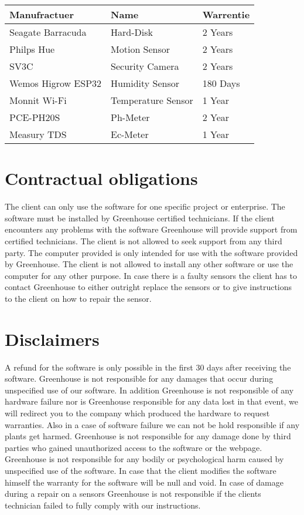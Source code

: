 \begin{table}
\begin{center}
\label{tab:Warrenties}
\begin{tabular}{| m{4cm} | m{4cm} | m{4cm} |}
\hline
\textbf{Manufractuer} & \textbf{Name} & \textbf{Warrentie} \\ \hline 
Seagate Barracuda & Hard-Disk & 2 Years \\ \hline 
Philps Hue & Motion Sensor & 2 Years \\ \hline 
SV3C & Security Camera & 2 Years \\ \hline 
Wemos Higrow ESP32 & Humidity Sensor & 180 Days \\ \hline
Monnit Wi-Fi & Temperature Sensor & 1 Year \\ \hline
PCE-PH20S& Ph-Meter & 2 Year \\ \hline
Measury TDS & Ec-Meter & 1 Year \\ 
\hline 
\end{tabular}
\end{center}
\end{table}


\section{Contractual obligations}
The client can only use the software for one specific project or enterprise. The
software must be installed by Greenhouse certified technicians. If the client
encounters any problems with the software Greenhouse will provide support from
certified technicians. The client is not allowed to seek support from any third
party. The computer provided is only intended for use with the software provided
by Greenhouse. The client is not allowed to install any other software or use
the computer for any other purpose. In case there is a faulty sensors the client
has to contact Greenhouse to either outright replace the sensors or to give
instructions to the client on how to repair the sensor.

\section{Disclaimers}
A refund for the software is only possible in the first 30 days after receiving
the software. Greenhouse is not responsible for any damages that occur during
unspecified use of our software. In addition Greenhouse is not responsible of
any hardware failure nor is Greenhouse responsible for any data lost in that
event, we will redirect you to the company which produced the hardware to
request warranties. Also in a case of software failure we can not be hold
responsible if any plants get harmed. Greenhouse is not responsible for any
damage done by third parties who gained unauthorized access to the software or
the webpage. Greenhouse is not responsible for any bodily or psychological harm
caused by unspecified use of the software. In case that the client modifies the
software himself the warranty for the software will be null and void. In case of
damage during a repair on a sensors Greenhouse is not responsible if the clients
technician failed to fully comply with our instructions.

